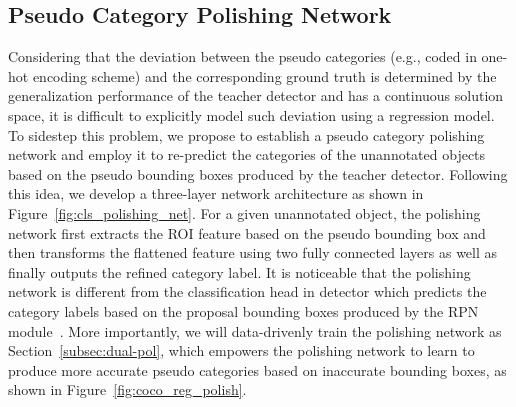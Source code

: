 \documentclass[letterpaper]{article} \usepackage{aaai23}  \usepackage{times}  \usepackage{helvet}  \usepackage{courier}  \usepackage[hyphens]{url}  \usepackage{graphicx} \urlstyle{rm} \def\UrlFont{\rm}  \usepackage{natbib}  \usepackage{caption} \frenchspacing  \setlength{\pdfpagewidth}{8.5in}  \setlength{\pdfpageheight}{11in}  \usepackage{algorithm}
\begin{document}
\subsection{Pseudo Category Polishing Network}
\label{sec::classification_polishing_network}
Considering that the deviation between the pseudo categories (e.g., coded in one-hot encoding scheme) and the corresponding ground truth is determined by the generalization performance of the teacher detector and has a continuous solution space, it is difficult to explicitly model such deviation using a regression model. To sidestep this problem, we propose to establish a pseudo category polishing network and employ it to re-predict the categories of the unannotated objects based on the pseudo bounding boxes produced by the teacher detector. Following this idea, we develop a three-layer network architecture as shown in Figure~\ref{fig:cls_polishing_net}. For a given unannotated object, the polishing network first extracts the ROI feature based on the pseudo bounding box and then transforms the flattened feature using two fully connected layers as well as finally outputs the refined category label. It is noticeable that the polishing network is different from the classification head in detector which predicts the category labels based on the proposal bounding boxes produced by the RPN module~\cite{NIPS2015_14bfa6bb,Lin_2017_ICCV}. More importantly, we will data-drivenly train the polishing network as Section~\ref{subsec:dual-pol}, which empowers the polishing network to learn to produce more accurate pseudo categories based on inaccurate bounding boxes, as shown in Figure~\ref{fig:coco_reg_polish}.
\end{document}
